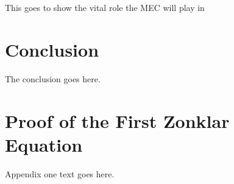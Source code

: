 \documentclass[conference,compsoc]{IEEEtran}
\theoremstyle{definition}
\begin{document}

This goes to show the vital role the MEC will play in

\section{Conclusion}
The conclusion goes here.






%


\appendices
\section{Proof of the First Zonklar Equation}
Appendix one text goes here.

\end{document}
